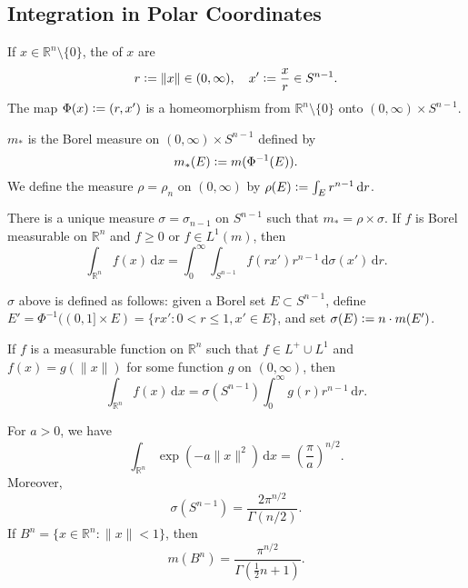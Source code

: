 \documentclass[12pt]{article}	%
\begin{document}
\subsection{Integration in Polar Coordinates}

If $x \in \mathbb{R}^{n} \setminus \{0\}$, the  of $x$ are
\begin{equation*} 
	r \vcentcolon= \|x\| \in (0, \infty), \quad x' \vcentcolon= \frac{x}{r} \in S^{n - 1}.
\end{equation*}
The map $\Phi(x) \vcentcolon= (r, x')$ is a homeomorphism from $\mathbb{R}^{n} \setminus \{0\}$ onto $(0, \infty) \times S^{n - 1}$.

$m_{\ast}$ is the Borel measure on $(0, \infty) \times S^{n - 1}$ defined by
\begin{equation*} 
	m_{\ast}(E) \vcentcolon= m(\Phi^{-1}(E)).
\end{equation*}
We define the measure $\rho = \rho_{n}$ on $(0, \infty)$ by $\rho(E) \vcentcolon= \int_{E} r^{n - 1} \,{\mathrm d} r$.

\begin{thm}
	There is a unique measure $\sigma = \sigma_{n - 1}$ on $S^{n - 1}$ such that $m_{\ast} = \rho \times \sigma$. If $f$ is Borel measurable on $\mathbb{R}^{n}$ and $f \ge 0$ or $f \in L^{1}(m)$, then
	\begin{equation*} 
		\int_{\mathbb{R}^{n}} f(x) \,{\mathrm{d}}x = \int_{0}^{\infty} \int_{S^{n - 1}} f(r x') r^{n - 1} \,{\mathrm{d}}\sigma(x') \,{\mathrm{d}}r.
	\end{equation*}
\end{thm}

$\sigma$ above is defined as follows: given a Borel set $E \subset S^{n - 1}$, define $E' = \Phi^{-1}((0, 1] \times E) = \{rx' : 0 < r \le 1, x' \in E\}$, and set $\sigma(E) \vcentcolon= n \cdot m(E')$.

\begin{cor}
	If $f$ is a measurable function on $\mathbb{R}^{n}$ such that $f \in L^{+} \cup L^{1}$ and $f(x) = g(\|x\|)$ for some function $g$ on $(0, \infty)$, then
	\begin{equation*} 
		\int_{\mathbb{R}^{n}} f(x) \,{\mathrm{d}}x = \sigma(S^{n - 1}) \int_{0}^{\infty} g(r) r^{n - 1} \,{\mathrm{d}}r.
	\end{equation*}
\end{cor}

\begin{prop}
	For $a > 0$, we have
	\begin{equation*} 
		\int_{\mathbb{R}^{n}}^{} \exp(-a \|x\|^{2}) \,{\mathrm{d}}x = \left(\frac{\pi}{a}\right)^{n/2}.
	\end{equation*}
	Moreover,
	\begin{equation*} 
		\sigma(S^{n - 1}) = \frac{2 \pi^{n/2}}{\Gamma(n/2)}.
	\end{equation*}
	If $B^{n} = \{x \in \mathbb{R}^{n} : \|x\| < 1\}$, then
	\begin{equation*} 
		m(B^{n}) = \frac{\pi^{n/2}}{\Gamma\left(\frac{1}{2}n + 1\right)}.
	\end{equation*}
\end{prop}
\end{document}
